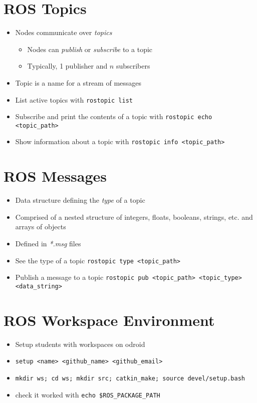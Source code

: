 \documentclass{article}
\begin{document}
\section{ROS Topics}
\begin{itemize}
    \item Nodes communicate over \textit{topics}
    \begin{itemize}
        \item Nodes can \textit{publish} or \textit{subscribe} to a topic
        \item Typically, 1 publisher and $n$ subscribers
    \end{itemize}
    \item Topic is a name for a stream of messages
    \item List active topics with \lstinline{rostopic list}
    \item Subscribe and print the contents of a topic with \lstinline{rostopic echo <topic_path>}
    \item Show information about a topic with \lstinline{rostopic info <topic_path>}
\end{itemize}
\section{ROS Messages}
\begin{itemize}
    \item Data structure defining the \textit{type} of a topic
    \item Comprised of a nested structure of integers, floats, booleans, strings, etc. and arrays of objects
    \item Defined in \textit{*.msg} files
    \item See the type of a topic \lstinline{rostopic type <topic_path>}
    \item Publish a message to a topic \lstinline{rostopic pub <topic_path> <topic_type> <data_string>}
\end{itemize}
\section{ROS Workspace Environment}
\begin{itemize}
    \item Setup students with workspaces on odroid
    \item \lstinline{setup <name> <github_name> <github_email>}
    \item \lstinline{mkdir ws; cd ws; mkdir src; catkin_make; source devel/setup.bash}
    \item check it worked with \lstinline{echo $ROS_PACKAGE_PATH}
\end{itemize}
\end{document}
